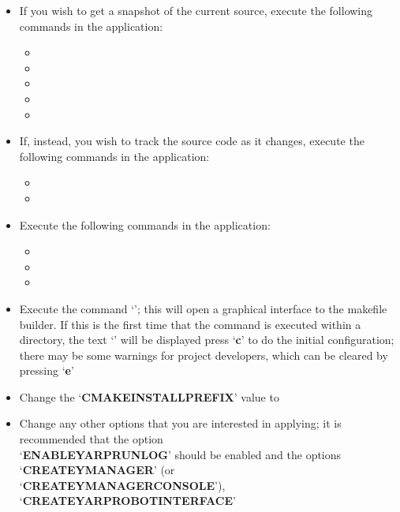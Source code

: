 \begin{itemize}
\item If you wish to get a snapshot of the current source, execute the following commands
in the  application:
\begin{itemize}
\item {}
\item\exSp{}
\item\exSp{}
\item\exSp{}
\item\exSp{}
\end{itemize}
\item\exSp{}If, instead, you wish to track the source code as it changes, execute the
following commands in the  application:
\begin{itemize}
\item {}
\item\exSp{}
\end{itemize}
\item\exSp{}Execute the following commands in the  application:
\begin{itemize}
\item {}
\item\exSp{}
\item\exSp{}
\end{itemize}
\item\exSp{}Execute the command `'; this will open a graphical
interface to the makefile builder. If this is the first time that the command is executed
within a directory, the text `' will be displayed \longDash{} press
`\textbf{c}' to do the initial configuration; there may be some warnings for project
developers, which can be cleared by pressing `\textbf{e}'
\item\exSp{}Change the `\textbf{CMAKE\fUS{}INSTALL\fUS{}PREFIX}' value to
\item\exSp{}Change any other options that you are interested in applying; it is
recommended that the option\\
`\textbf{ENABLE\fUS{}YARPRUN\fUS{}LOG}' should be enabled and the options
`\textbf{CREATE\fUS{}YMANAGER}' (or\\
`\textbf{CREATE\fUS{}YMANAGER\fUS{}CONSOLE}'), `\textbf{CREATE\fUS{}YARPROBOTINTERFACE}'

\end{itemize}
